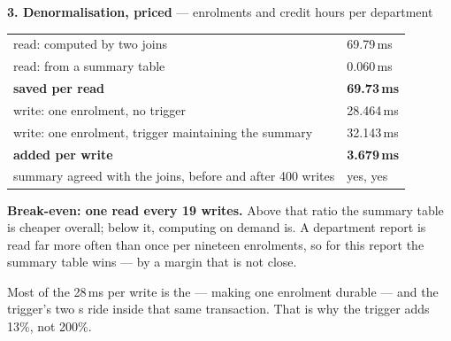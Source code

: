 \begin{measured}
\medskip
\textbf{3. Denormalisation, priced} --- enrolments and credit hours per
department

\begin{tabular}{@{}L{8.4cm}R{2.6cm}@{}}
read: computed by two joins & 69.79\,ms \\
read: from a summary table & 0.060\,ms \\
\quad \textbf{saved per read} & \textbf{69.73\,ms} \\
write: one enrolment, no trigger & 28.464\,ms \\
write: one enrolment, trigger maintaining the summary & 32.143\,ms \\
\quad \textbf{added per write} & \textbf{3.679\,ms} \\
summary agreed with the joins, before and after 400 writes & yes, yes \\
\end{tabular}

\smallskip
\textbf{Break-even: one read every 19 writes.} Above that ratio the summary
table is cheaper overall; below it, computing on demand is. A department report
is read far more often than once per nineteen enrolments, so for this report
the summary table wins --- by a margin that is not close.

\smallskip
Most of the 28\,ms per write is the  --- making one enrolment
durable --- and the trigger's two s ride inside that same
transaction. That is why the trigger adds 13\%, not 200\%.
\end{measured}

